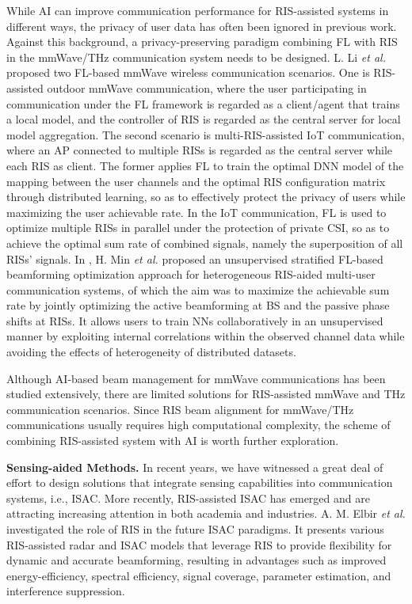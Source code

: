 \documentclass[journal,comsoc]{IEEEtran}
\begin{document}
While AI can improve communication performance for RIS-assisted systems in different ways, the privacy of user data has often been ignored in previous work. Against this background, a privacy-preserving paradigm combining FL with RIS in the mmWave/THz communication system needs to be designed. L. Li \emph{et al.} \cite{Enhanced-RIS-FL-2020} proposed two FL-based mmWave wireless communication scenarios. One is RIS-assisted outdoor mmWave communication, where the user participating in communication under the FL framework is regarded as a client/agent that trains a local model, and the controller of RIS is regarded as the central server for local model aggregation. The second scenario is multi-RIS-assisted IoT communication, where an AP connected to multiple RISs is regarded as the central server while each RIS as client. The former applies FL to train the optimal DNN model of the mapping between the user channels and the optimal RIS configuration matrix through distributed learning, so as to effectively protect the privacy of users while maximizing the user achievable rate. In the IoT communication, FL is used to optimize multiple RISs in parallel under the protection of private CSI, so as to achieve the optimal sum rate of combined signals, namely the superposition of all RISs' signals. In \cite{Stratified-Federated-Learning-Beamforming-Design-2023}, H. Min \emph{et al.} proposed an unsupervised stratified FL-based beamforming optimization approach for heterogeneous RIS-aided multi-user communication systems, of which the aim was to maximize the achievable sum rate by jointly optimizing the active beamforming at BS and the passive phase shifts at RISs. It allows users to train NNs collaboratively in an unsupervised manner by exploiting internal correlations within the observed channel data while avoiding the effects of heterogeneity of distributed datasets.

Although AI-based beam management for mmWave communications has been studied extensively, there are limited solutions for RIS-assisted mmWave and THz communication scenarios. Since RIS beam alignment for mmWave/THz communications usually requires high computational complexity, the scheme of combining RIS-assisted system with AI is worth further exploration.


{\bf{Sensing-aided Methods.}} In recent years, we have witnessed a great deal of effort to design solutions that integrate sensing capabilities into communication systems, i.e., ISAC. More recently, RIS-assisted ISAC has emerged and are attracting increasing attention in both academia and industries. A. M. Elbir \emph{et al.} \cite{The-Rise-IRS-ISAC-2022} investigated the role of RIS in the future ISAC paradigms. It presents various RIS-assisted radar and ISAC models that leverage RIS to provide flexibility for dynamic and accurate beamforming, resulting in advantages such as improved energy-efficiency, spectral efficiency, signal coverage, parameter estimation, and interference suppression.
\end{document}
